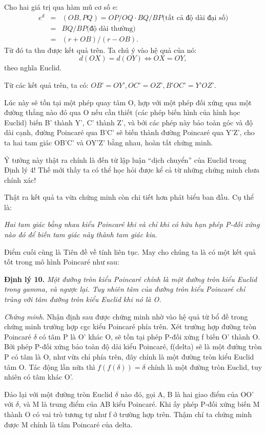 Cho hai giá trị qua hàm mũ cơ số e:
\begin{eqnarray*}
e^d& = &(OB, PQ) = OP/OQ \cdot BQ/BP \textrm{(tất cả độ dài đại số)} \\
&= &
BQ/BP \textrm{(độ dài thường)}\\
& = &(r + OB)/(r-OB).
\end{eqnarray*} 
Từ đó ta thu được kết quả trên.
Ta chú ý vào hệ quả của nó: 
$$d(OX) = d(OY) 
\Longleftrightarrow OX = OY,$$ theo nghĩa Euclid.

Từ các kết quả trên, ta có: $OB’ = OY’, OC’ = OZ’, B’OC’ = Y’OZ’.$

Lúc này sẽ tồn tại một phép quay tâm O, hợp với một phép đối xứng qua một đường thẳng nào đó qua O nếu cần thiết (các phép biến hình của hình học Euclid) biến B’ thành Y’, C’ thành Z’, và bởi các phép này bảo toàn góc và độ dài cạnh, đường Poincar\'e qua B’C’ sẽ biến thành đường Poincar\'e qua Y’Z’, cho ta hai tam giác OB’C’ và OY’Z’ bằng nhau, hoàn tất chứng minh.

Ý tưởng này thật ra chính là đến từ lập luận ``dịch chuyển” của Euclid trong Định lý 4! Thế mới thấy ta có thể học hỏi được kể cả từ những chứng minh chưa chính xác!
 
Thật ra kết quả ta vừa chứng minh còn chi tiết hơn phát biểu ban đầu. Cụ thể là:

\textit{Hai tam giác bằng nhau kiểu Poincar\'e khi và chỉ khi có hữu hạn phép P-đối xứng nào đó để biến tam giác này thành tam giác kia.}


Điểm cuối cùng là Tiên đề về tính liên tục. May cho chúng ta là có một kết quả tốt trong mô hình Poincar\'e như sau:

\textbf{Định lý 10.}  \textit{Một đường tròn kiểu Poincar\'e chính là một đường tròn kiểu Euclid trong gamma, và ngược lại. Tuy nhiên tâm của đường tròn kiểu Poincar\'e chỉ trùng với tâm đường tròn kiểu Euclid khi nó là O.}

\textit{Chứng minh}. Nhận định sau được chứng minh nhờ vào hệ quả từ bổ đề trong chứng minh trường hợp cgc kiểu Poincar\'e phía trên. 
Xét trường hợp đường tròn Poincar\'e $\delta$ có tâm P là O’ khác O, sẽ tồn tại phép P-đối xứng f biến O’ thành O. Bởi phép P-đối xứng bảo toàn độ dài kiểu Poincar\'e, f(delta) sẽ là một đường tròn P có tâm là O, như vừa chỉ phía trên, đây chính là một đường tròn kiểu Euclid tâm O. Tác động lần nữa thì 
$f(f(\delta)) = \delta$ chính là một đường tròn Euclid, tuy nhiên có tâm khác O’.

Đảo lại với một đường tròn Euclid $\delta$ nào đó, gọi A, B là hai giao điểm của OO’ với $\delta$, và M là trung điểm của AB kiểu Poincar\'e. Khi ấy phép P-đối xứng biến M thành O có vai trò tương tự như f ở trường hợp trên. Thậm chí ta chứng minh được M chính là tâm Poincar\'e của delta.

